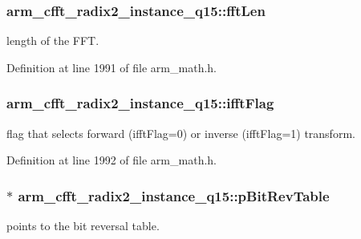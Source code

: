 \hypertarget{structarm__cfft__radix2__instance__q15_a874085647351dcf3f0de39d2b1d49744}{
\subsubsection[{fft\-Len}]{ arm\-\_\-cfft\-\_\-radix2\-\_\-instance\-\_\-q15\-::fft\-Len}}\label{structarm__cfft__radix2__instance__q15_a874085647351dcf3f0de39d2b1d49744}
length of the F\-F\-T. 

Definition at line 1991 of file arm\-\_\-math.\-h.

\hypertarget{structarm__cfft__radix2__instance__q15_ab5c073286bdd2f6e2bf783ced36bf1de}{
\subsubsection[{ifft\-Flag}]{ arm\-\_\-cfft\-\_\-radix2\-\_\-instance\-\_\-q15\-::ifft\-Flag}}\label{structarm__cfft__radix2__instance__q15_ab5c073286bdd2f6e2bf783ced36bf1de}
flag that selects forward (ifft\-Flag=0) or inverse (ifft\-Flag=1) transform. 

Definition at line 1992 of file arm\-\_\-math.\-h.

\hypertarget{structarm__cfft__radix2__instance__q15_ab88afeff6493be3c8b5e4530efa82d51}{
\subsubsection[{p\-Bit\-Rev\-Table}]{$\ast$ arm\-\_\-cfft\-\_\-radix2\-\_\-instance\-\_\-q15\-::p\-Bit\-Rev\-Table}}\label{structarm__cfft__radix2__instance__q15_ab88afeff6493be3c8b5e4530efa82d51}
points to the bit reversal table. 

